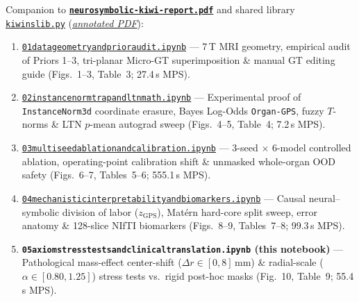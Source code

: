 \documentclass[10pt,a4paper]{article}
\renewcommand{\_}{\origunderscore\allowbreak}
\newcommand{\ghblob}{https://github.com/arvidl/BMED365-2027/blob/main}
\newcommand{\repodir}{Lab4-Comp-Imag/Kiwi-challenge/docs/neurosymbolic-report}
\begin{document}
\begin{seqbox}
{\footnotesize Companion to \href{\ghblob/\repodir/neurosymbolic-kiwi-report.pdf}{\textbf{\texttt{neurosymbolic-kiwi-report.pdf}}} and shared library \href{\ghblob/\repodir/notebooks/kiwi_ns_lib.py}{\texttt{kiwi\_ns\_lib.py}} (\href{\ghblob/\repodir/notebooks/kiwi_ns_lib_py.pdf}{\textit{annotated PDF}}):}
\begin{enumerate}[start=1, itemsep=1.2pt, topsep=2pt, font=\footnotesize]
    \item \href{\ghblob/\repodir/notebooks/01_data_geometry_and_prior_audit.ipynb}{\texttt{01\_data\_geometry\_and\_prior\_audit.ipynb}} --- 7\,T MRI geometry, empirical audit of Priors 1--3, tri-planar Micro-GT superimposition \& manual GT editing guide (Figs.\ 1--3, Table~3; 27.4\,s MPS).
    \item \href{\ghblob/\repodir/notebooks/02_instancenorm_trap_and_ltn_math.ipynb}{\texttt{02\_instancenorm\_trap\_and\_ltn\_math.ipynb}} --- Experimental proof of \texttt{InstanceNorm3d} coordinate erasure, Bayes Log-Odds \texttt{Organ-GPS}, fuzzy $T$-norms \& LTN $p$-mean autograd sweep (Figs.\ 4--5, Table~4; 7.2\,s MPS).
    \item \href{\ghblob/\repodir/notebooks/03_multiseed_ablation_and_calibration.ipynb}{\texttt{03\_multiseed\_ablation\_and\_calibration.ipynb}} --- 3-seed $\times$ 6-model controlled ablation, operating-point calibration shift \& unmasked whole-organ OOD safety (Figs.\ 6--7, Tables~5--6; 555.1\,s MPS).
    \item \href{\ghblob/\repodir/notebooks/04_mechanistic_interpretability_and_biomarkers.ipynb}{\texttt{04\_mechanistic\_interpretability\_and\_biomarkers.ipynb}} --- Causal neural--symbolic division of labor ($z_{\text{GPS}}$), Mat\'ern hard-core split sweep, error anatomy \& 128-slice NIfTI biomarkers (Figs.\ 8--9, Tables~7--8; 99.3\,s MPS).
    \item \textbf{\texttt{05\_axiom\_stress\_tests\_and\_clinical\_translation.ipynb} (this notebook)} --- Pathological mass-effect center-shift ($\Delta r \in [0, 8]$\,mm) \& radial-scale ($\alpha \in [0.80, 1.25]$) stress tests vs.\ rigid post-hoc masks (Fig.\ 10, Table~9; 55.4\,s MPS).
\end{enumerate}
\end{seqbox}
\end{document}

